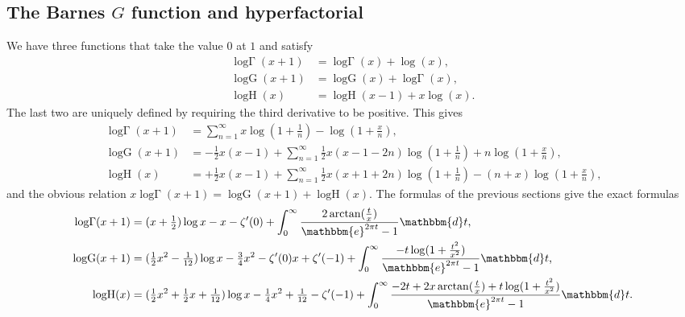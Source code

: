 \documentclass[12pt]{article}
\newcommand{\op}[1]  { \operatorname{ #1 }}
\newcommand{\logG} {\operatorname {log \Gamma}}
\newcommand{\ee}[0] {\mathbbm{e}}
\newcommand{\dd}[0] {\mathbbm{d}}
\numberwithin{equation}{section}
\begin{document}
\subsection{The Barnes $G$ function and hyperfactorial}
We have three functions that take the value $0$ at $1$ and satisfy
\begin{align*}
\logG(x+1) &= \logG(x) + \log (x)\text{,}\\
\op{logG}(x+1) &= \op{logG}(x) + \logG (x)\text{,}\\
\op{logH}(x) &= \op{logH}(x-1) + x \log (x)\text{.}
\end{align*}
The last two are uniquely defined by requiring the third derivative to be positive. This gives
\begin{align*}
\logG(x+1) &= \sum_{n=1}^{\infty} x \log(1+\tfrac{1}{n}) - \log(1+\tfrac{x}{n})\text{,}\\
\op{logG}(x+1) &= -\tfrac{1}{2} x(x-1) + \sum_{n=1}^{\infty} \tfrac{1}{2} x(x-1-2n) \log(1 + \tfrac{1}{n})+n \log(1+\tfrac{x}{n})\text{,}\\
\op{logH}(x) &= +\tfrac{1}{2} x(x-1) + \sum_{n=1}^{\infty} \tfrac{1}{2} x(x+1+2n) \log(1 + \tfrac{1}{n})-(n+x) \log(1+\tfrac{x}{n}) \text{,}
\end{align*}
and the obvious relation $x \logG(x+1) = \op{logG}(x+1) + \op{logH}(x)$.
The formulas of the previous sections give the exact formulas
\begin{align*}
\logG(x+1) &= (x+\tfrac{1}{2}) \log x - x - \zeta'(0) + \int_{0}^{\infty} \frac{2 \arctan( \tfrac{t}{x})}{\ee^{2\pi t}-1} \dd t\text{,}\\
\op{logG}(x+1) &= (\tfrac{1}{2}x^2-\tfrac{1}{12}) \log x - \tfrac{3}{4} x^2 - \zeta'(0) x + \zeta'(-1) + \int_{0}^{\infty} \frac{- t \log(1 + \tfrac{t^2}{x^2})}{\ee^{2\pi t}-1} \dd t\text{,}\\
\op{logH}(x) &= (\tfrac{1}{2}x^2+\tfrac{1}{2}x+\tfrac{1}{12}) \log x - \tfrac{1}{4} x^2 +\tfrac{1}{12} - \zeta'(-1) + \int_{0}^{\infty} \frac{-2t+2x \arctan( \tfrac{t}{x}) + t \log(1 + \tfrac{t^2}{x^2})}{\ee^{2\pi t}-1} \dd t\text{.}
\end{align*}
\end{document}
